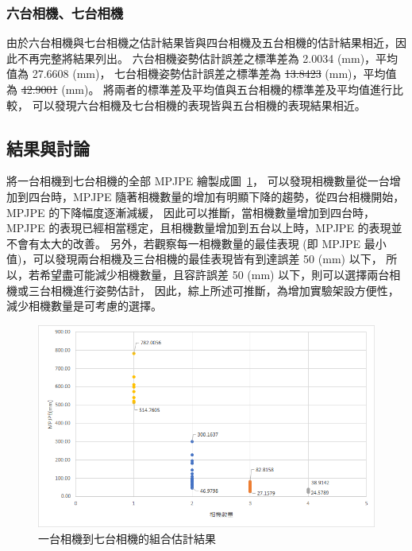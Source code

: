 \subsubsection{六台相機、七台相機}
由於六台相機與七台相機之估計結果皆與四台相機及五台相機的估計結果相近，因此不再完整將結果列出。
六台相機姿勢估計誤差之標準差為 2.0034 (mm)，平均值為 27.6608 (mm)，
七台相機姿勢估計誤差之標準差為 \sout{13.8423} (mm)，平均值為 \sout{42.9001} (mm)。
將兩者的標準差及平均值與五台相機的標準差及平均值進行比較，
可以發現六台相機及七台相機的表現皆與五台相機的表現結果相近。

\subsection{結果與討論}
將一台相機到七台相機的全部 MPJPE 繪製成圖~\ref{ch3_fig_1to7cam}，
可以發現相機數量從一台增加到四台時，MPJPE 隨著相機數量的增加有明顯下降的趨勢，從四台相機開始，MPJPE 的下降幅度逐漸減緩，
因此可以推斷，當相機數量增加到四台時，MPJPE 的表現已經相當穩定，且相機數量增加到五台以上時，MPJPE 的表現並不會有太大的改善。
另外，若觀察每一相機數量的最佳表現 (即 MPJPE 最小值)，可以發現兩台相機及三台相機的最佳表現皆有到達誤差 50 (mm) 以下，
所以，若希望盡可能減少相機數量，且容許誤差 50 (mm) 以下，則可以選擇兩台相機或三台相機進行姿勢估計，
因此，綜上所述可推斷，為增加實驗架設方便性，減少相機數量是可考慮的選擇。
\begin{figure}[!ht]
   \centering
   \includegraphics[width=12cm]{figure/ch3_fig_1to7cam.png}
   \caption[一台相機到七台相機的組合估計結果]{一台相機到七台相機的組合估計結果}
   \label{ch3_fig_1to7cam}
\end{figure}

